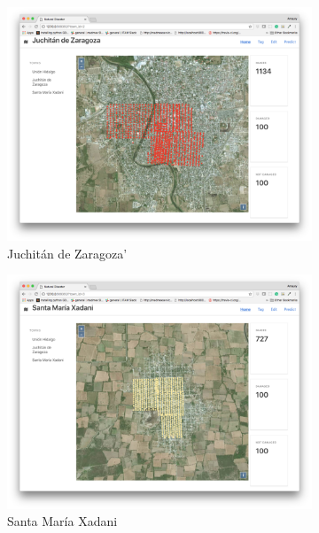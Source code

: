 \begin{figure}[ht]
  \centering
    \begin{subfigure}{.49\textwidth}
        \includegraphics[width=\textwidth]{images/small-app-juchitan.png}
        \caption{Juchit\'an de Zaragoza'}
    \end{subfigure}
    \begin{subfigure}{.49\textwidth}
        \includegraphics[width=\textwidth]{images/small-app-santamaria.png}
        \caption{Santa Mar\'ia Xadani}
    \end{subfigure}
    \begin{subfigure}{.49\textwidth}

\end{subfigure}
\end{figure}
